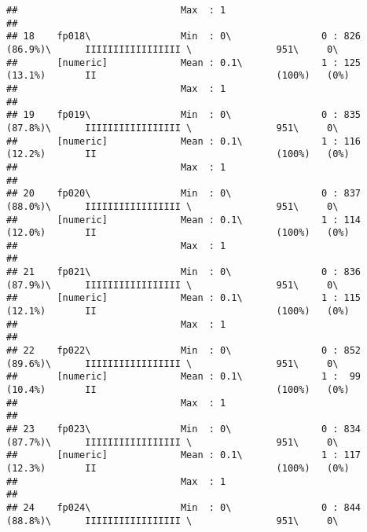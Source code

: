 \documentclass[]{article}
\begin{document}
\begin{verbatim}
##                             Max  : 1                                                                                           
## 
## 18    fp018\                Min  : 0\                0 : 826 (86.9%)\      IIIIIIIIIIIIIIIII \               951\     0\       
##       [numeric]             Mean : 0.1\              1 : 125 (13.1%)       II                                (100%)   (0%)     
##                             Max  : 1                                                                                           
## 
## 19    fp019\                Min  : 0\                0 : 835 (87.8%)\      IIIIIIIIIIIIIIIII \               951\     0\       
##       [numeric]             Mean : 0.1\              1 : 116 (12.2%)       II                                (100%)   (0%)     
##                             Max  : 1                                                                                           
## 
## 20    fp020\                Min  : 0\                0 : 837 (88.0%)\      IIIIIIIIIIIIIIIII \               951\     0\       
##       [numeric]             Mean : 0.1\              1 : 114 (12.0%)       II                                (100%)   (0%)     
##                             Max  : 1                                                                                           
## 
## 21    fp021\                Min  : 0\                0 : 836 (87.9%)\      IIIIIIIIIIIIIIIII \               951\     0\       
##       [numeric]             Mean : 0.1\              1 : 115 (12.1%)       II                                (100%)   (0%)     
##                             Max  : 1                                                                                           
## 
## 22    fp022\                Min  : 0\                0 : 852 (89.6%)\      IIIIIIIIIIIIIIIII \               951\     0\       
##       [numeric]             Mean : 0.1\              1 :  99 (10.4%)       II                                (100%)   (0%)     
##                             Max  : 1                                                                                           
## 
## 23    fp023\                Min  : 0\                0 : 834 (87.7%)\      IIIIIIIIIIIIIIIII \               951\     0\       
##       [numeric]             Mean : 0.1\              1 : 117 (12.3%)       II                                (100%)   (0%)     
##                             Max  : 1                                                                                           
## 
## 24    fp024\                Min  : 0\                0 : 844 (88.8%)\      IIIIIIIIIIIIIIIII \               951\     0\       

\end{verbatim}
\end{document}
